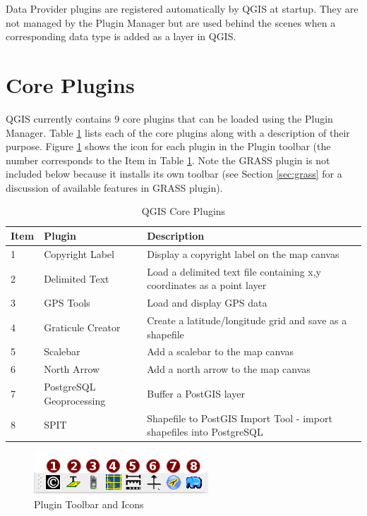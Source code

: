 Data Provider plugins are registered automatically by QGIS at startup. They are not managed by the Plugin Manager but are used behind the scenes when a corresponding data type is added as a layer in QGIS.
\section{Core Plugins}
QGIS currently contains 9 core plugins that can be loaded using the Plugin Manager. Table \ref{tab:core_plugins} lists each of the core plugins along with a description of their purpose. Figure \ref{fig:plugintoolbar} shows the icon for each plugin in the Plugin toolbar (the number corresponds to the Item in Table \ref{tab:core_plugins}. Note the GRASS plugin is not included below because it installs its own toolbar (see Section \ref{sec:grass} for a discussion of available features in GRASS plugin).
\begin{table}[h]
\centering
\caption{QGIS Core Plugins}\label{tab:core_plugins}\medskip
\small
 \begin{tabular}{|l|l|p{4in}|}
\hline \textbf{Item} & \textbf{Plugin} & \textbf{Description} \\
\hline 1 & Copyright Label \index{plugins!copyright}& Display a copyright label on the map canvas\\
\hline 2 & Delimited Text \index{plugins!delimited text}& Load a delimited text file containing x,y coordinates as a point layer \\
\hline 3 & GPS Tools \index{plugins!gps}& Load and display GPS data \\
\hline 4 & Graticule Creator \index{plugins!graticule}& Create a latitude/longitude grid and save as a shapefile\\
\hline 5 & Scalebar \index{plugins!scalebar}& Add a scalebar to the map canvas\\
\hline 6 & North Arrow \index{plugins!north arrow}& Add a north arrow to the map canvas\\
\hline 7 & PostgreSQL Geoprocessing \index{plugins!geoprocessing}& Buffer a PostGIS layer \\
\hline 8 & SPIT \index{plugins!SPIT}& Shapefile to PostGIS Import Tool - import shapefiles into PostgreSQL\\
\hline
\end{tabular}
\end{table}
\normalsize
\begin{figure}[h]
   \begin{center}
   \caption{Plugin Toolbar and Icons}\label{fig:plugintoolbar}\smallskip
   \includegraphics[scale=1.0]{qgis_user_guide_images/plugintoolbar}
\end{center}  
\end{figure}

\begin{Tip}\caption{\textsc{Plugins Settings Saved to Project}}
\end{Tip}